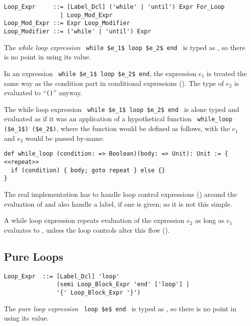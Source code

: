\syntax\begin{lstlisting}
Loop_Expr     ::= [Label_Dcl] ('while' | 'until') Expr For_Loop
                | Loop_Mod_Expr
Loop_Mod_Expr ::= Expr Loop_Modifier
Loop_Modifier ::= ('while' | 'until') Expr
\end{lstlisting}

The {\em while loop expression} ~\lstinline!while $e_1$ loop $e_2$ end!~ is typed as , so there is no point in using its value. 

In an expression ~\lstinline!while $e_1$ loop $e_2$ end!, the expression $e_1$ is treated the same way as the condition part in conditional expressions (). The type of $e_2$ is evaluated to ``\lstinline!()!'' anyway.

The while loop expression ~\lstinline!while $e_1$ loop $e_2$ end!~ is alone typed and evaluated as if it was an application of a hypothetical function ~\lstinline!while_loop ($e_1$) ($e_2$)!, where the function  would be defined as follows, with the $e_1$ and $e_2$ would be passed by-name: 
\begin{lstlisting}
def while_loop (condition: => Boolean)(body: => Unit): Unit := {
<<repeat>>
  if (condition) { body; goto repeat } else {}
}
\end{lstlisting}
The real implementation has to handle loop control expressions () around the evaluation of  and also handle a label, if one is given; so it is not this simple. 

A while loop expression repeats evaluation of the expression $e_2$ as long as $e_1$ evaluates to , unless the loop controls alter this flow ().





\subsection{Pure Loops}
\label{sec:pure-loops}

\syntax\begin{lstlisting}
Loop_Expr  ::= [Label_Dcl] 'loop'
               (semi Loop_Block_Expr 'end' ['loop'] | 
               '{' Loop_Block_Expr '}')
\end{lstlisting}

The {\em pure loop expression} ~\lstinline!loop $e$ end!~ is typed as , so there is no point in using its value. 

